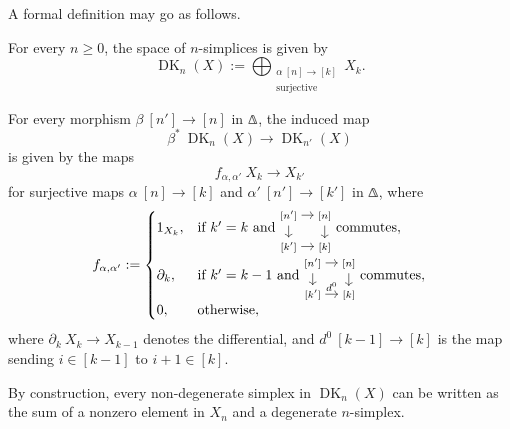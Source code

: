\begin{construction}
\begin{center}
    \end{center}

    A formal definition may go as follows. 
    \begin{itms}
        \item For every $n\geq0$, the space of $n$-simplices is given by
        \[\operatorname{DK}_n(X):=\bigoplus_{\substack{\alpha\:[n]\to[k]\\\text{surjective}}}X_k.\]
        \item For every morphism $\beta\:[n']\to[n]$ in $\bfDelta$,
        the induced map
        \[\beta^*\:\operatorname{DK}_{n}(X)\to\operatorname{DK}_{n'}(X)\]
        is given by the maps 
        \[f_{\alpha,\alpha'}\:X_k\to X_{k'}\]
        for surjective maps $\alpha\:[n]\to[k]$ and $\alpha'\:[n']\to[k']$ in $\bfDelta$,
        where 
        \[f_{\alpha,\alpha'}:=\begin{cases}
            1_{X_k}, & \text{if }k'=k\text{ and }
            \begin{tikzcd}[cramped, sep=.9em]
                \scriptstyle[n']\ar[r]\ar[d] & \scriptstyle[n]\ar[d] \\{}
                \scriptstyle[k']\ar[r] & \scriptstyle[k]
            \end{tikzcd}\text{ commutes},\\[15pt]
            \partial_k, & \text{if }k'=k-1\text{ and }
            \begin{tikzcd}[cramped, sep=.9em]
                \scriptstyle[n']\ar[r]\ar[d] & \scriptstyle[n]\ar[d] \\{}
                \scriptstyle[k']\ar[r,"d^0"] & \scriptstyle[k]
            \end{tikzcd}\text{ commutes},\\
            0, & \text{otherwise},
        \end{cases}\]
        where $\partial_k\:X_k\to X_{k-1}$ denotes the differential,
        and $d^0\:[k-1]\to[k]$ is the map sending $i\in[k-1]$ to $i+1\in[k]$. \varqed
    \end{itms}
\end{construction}

By construction, every non-degenerate simplex in $\operatorname{DK}_n(X)$
can be written as the sum of a nonzero element in $X_n$
and a degenerate $n$-simplex.


